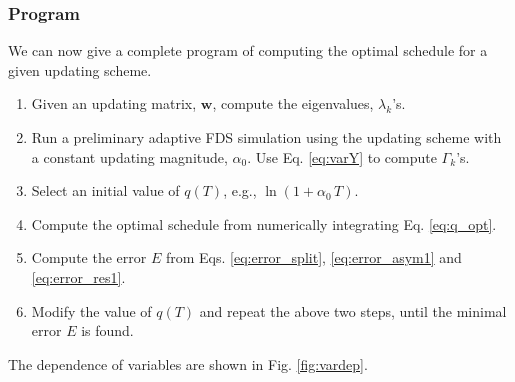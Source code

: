 \documentclass[reprint, floatfix]{revtex4-1}
\begin{document}
\subsubsection{\label{sec:program}
Program}


We can now give a complete program of computing
the optimal schedule for a given updating scheme.

\begin{enumerate}

\item
Given an updating matrix, $\mathbf w$,
compute the eigenvalues, $\lambda_k$'s.

\item
Run a preliminary adaptive FDS simulation
using the updating scheme with a constant
updating magnitude, $\alpha_0$.
Use Eq. \eqref{eq:varY} to compute $\Gamma_k$'s.

\item
Select an initial value of $q(T)$,
e.g., $\ln(1 + \alpha_0 \, T)$.

\item
Compute the optimal schedule from
numerically integrating Eq. \eqref{eq:q_opt}.

\item
Compute the error $E$ from
Eqs. \eqref{eq:error_split},
  \eqref{eq:error_asym1} and
  \eqref{eq:error_res1}.

\item
Modify the value of $q(T)$ and repeat the above two steps,
until the minimal error $E$ is found.

\end{enumerate}

The dependence of variables are shown in Fig. \ref{fig:vardep}.
\end{document}
